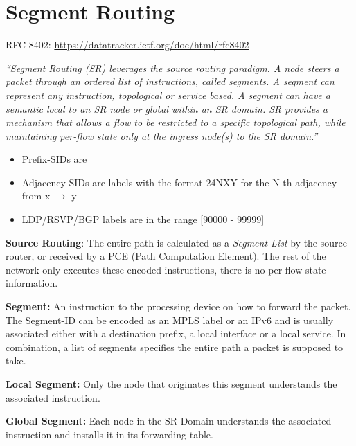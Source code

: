 \section{Segment Routing}

RFC 8402: \url{https://datatracker.ietf.org/doc/html/rfc8402}

\vspace{5mm}
\emph{``Segment Routing (SR) leverages the source routing paradigm.  A node 
   steers a packet through an ordered list of instructions, called 
   segments.  A segment can represent any instruction, topological or 
   service based.  A segment can have a semantic local to an SR node or 
   global within an SR domain.  SR provides a mechanism that allows a 
   flow to be restricted to a specific topological path, while 
   maintaining per-flow state only at the ingress node(s) to the SR 
   domain.''}

\begin{itemize}
    \item Prefix-SIDs are 
    \item Adjacency-SIDs are labels with the format 24NXY for the N-th adjacency from x $ \rightarrow $ y
    \item LDP/RSVP/BGP labels are in the range  [90000 - 99999]
\end{itemize}

\vspace{5mm}
\textbf{Source Routing}: The entire path is calculated as a \emph{Segment List} by the source router, or received by a PCE (Path Computation Element). 
The rest of the network only executes these encoded instructions, there is no per-flow state information. 

\vspace{5mm}
\textbf{Segment:} An instruction to the processing device on how to forward the packet. The Segment-ID can be encoded as an MPLS label or an IPv6 and is usually associated
either with a destination prefix, a local interface or a local service. In combination, a list of segments specifies the entire path a packet is supposed to take.

\vspace{5mm}
\textbf{Local Segment:} Only the node that originates this segment understands the associated instruction.

\vspace{5mm}
\textbf{Global Segment:} Each node in the SR Domain understands the associated instruction and installs it in its forwarding table.

